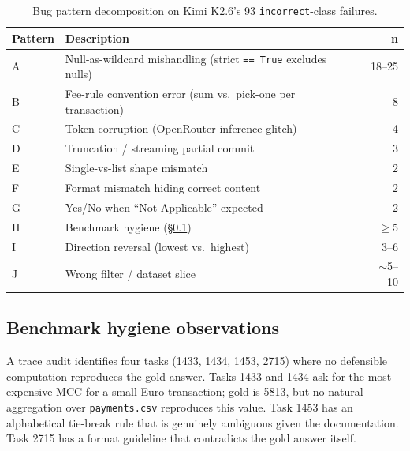 \documentclass[conference]{IEEEtran}
\newcommand{\Kimi}{Kimi K2.6}
\begin{document}
\begin{table}[t]
\centering
\caption{Bug pattern decomposition on \Kimi{}'s 93 \texttt{incorrect}-class failures.}
\label{tab:bug_patterns}
\small
\begin{tabular}{lp{4.4cm}r}
\toprule
Pattern & Description & n \\
\midrule
A & Null-as-wildcard mishandling (strict \texttt{== True} excludes nulls)                 & 18--25 \\
B & Fee-rule convention error (sum vs.\ pick-one per transaction)                          & 8 \\
C & Token corruption (OpenRouter inference glitch)                                          & 4 \\
D & Truncation / streaming partial commit                                                   & 3 \\
E & Single-vs-list shape mismatch                                                            & 2 \\
F & Format mismatch hiding correct content                                                   & 2 \\
G & Yes/No when ``Not Applicable'' expected                                                 & 2 \\
H & Benchmark hygiene (\S\ref{subsec:benchmark_errors})                                       & $\geq$5 \\
I & Direction reversal (lowest vs.\ highest)                                                 & 3--6 \\
J & Wrong filter / dataset slice                                                              & $\sim$5--10 \\
\bottomrule
\end{tabular}
\end{table}

\subsection{Benchmark hygiene observations}
\label{subsec:benchmark_errors}

A trace audit identifies four tasks (1433, 1434, 1453, 2715) where no defensible computation reproduces the gold answer. Tasks 1433 and 1434 ask for the most expensive MCC for a small-Euro transaction; gold is 5813, but no natural aggregation over \texttt{payments.csv} reproduces this value. Task 1453 has an alphabetical tie-break rule that is genuinely ambiguous given the documentation. Task 2715 has a format guideline that contradicts the gold answer itself.
\end{document}
